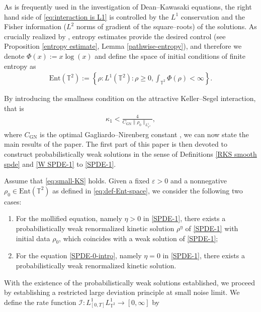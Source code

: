 As is frequently used in the investigation of Dean--Kawasaki equations, the right hand side of \eqref{eq:interaction is L1} is controlled by the $L^1$ conservation and the Fisher information ($L^2$ norms of gradient of the square--roots) of the solutions. As crucially realized by \cite{FG24}, entropy estimates provide the desired control (see Proposition \ref{entropy estimate}, Lemma \ref{pathwise-entropy}), and therefore we denote $\Phi(x) := x\log(x)$ and define the space of initial conditions of finite entropy as 
\begin{align}\label{eq:def-Ent-space}
    \mathrm{Ent}(\mathbb{T}^2) := \left\{\rho: L^1(\mathbb{T}^2): \rho \geq 0, \int_{\mathbb{T}^2}\Phi(\rho) < \infty\right\}.
\end{align}

By introducing the smallness condition on the attractive Keller--Segel interaction, that is 
\begin{align}\label{eq:small-KS}
\kappa_1 < \frac{4}{C_{\mathrm{GN}}\|\rho_0\|_{L^1_{\mathbb{T}^2}}},
\end{align}
where $C_{\mathrm{GN}}$ is the optimal Gagliardo--Nirenberg constant , we can now state the main results of the paper. The first part of this paper is then devoted to construct probabilistically weak solutions in the sense of Definitions \ref{RKS smooth spde} and \ref{W SPDE-1} to \eqref{SPDE-1}. 
\begin{thm}\label{spde WP}Assume that \eqref{eq:small-KS} holds. Given a fixed $\varepsilon > 0$ and a nonnegative $\rho_0 \in \mathrm{Ent}(\mathbb{T}^2)$ as defined in \eqref{eq:def-Ent-space}, we consider the following two cases: 
\begin{enumerate}
\item For the mollified equation, namely $\eta > 0$ in \eqref{SPDE-1}, there exists a probabilistically weak renormalized kinetic solution $\rho^{\eta}$ of \eqref{SPDE-1} with initial data $\rho_0$, which coincides with a weak solution of \eqref{SPDE-1};
\item For the equation \eqref{SPDE-0-intro}, namely $\eta = 0$ in \eqref{SPDE-1}, there exists a probabilistically weak renormalized kinetic solution.
\end{enumerate}
\end{thm}


With the existence of the probabilistically weak solutions established, we proceed by establishing a restricted large deviation principle at small noise limit. We define the rate function $\mathcal{I}:L_{[0,T]}^1L_{\mathbb{T}^2}^1\rightarrow [0,\infty]$ by 

